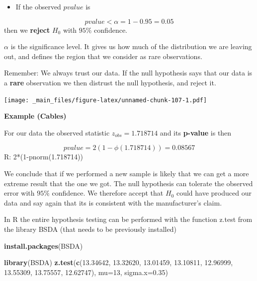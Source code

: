 \documentclass[
]{book}
\newenvironment{Shaded}{\begin{snugshade}}{\end{snugshade}}
\newcommand{\AttributeTok}[1]{\textcolor[rgb]{0.13,0.29,0.53}{#1}}
\newcommand{\DecValTok}[1]{\textcolor[rgb]{0.00,0.00,0.81}{#1}}
\newcommand{\FloatTok}[1]{\textcolor[rgb]{0.00,0.00,0.81}{#1}}
\newcommand{\FunctionTok}[1]{\textcolor[rgb]{0.13,0.29,0.53}{\textbf{#1}}}
\newcommand{\NormalTok}[1]{#1}
\providecommand{\tightlist}{%
  \setlength{\itemsep}{0pt}\setlength{\parskip}{0pt}}
\begin{document}
\begin{itemize}
\tightlist
\item
  If the observed \(pvalue\) is
\end{itemize}

\[pvalue < \alpha =1-0.95=0.05\]
then we \textbf{reject} \(H_0\) with \(95\%\) confidence.

\(\alpha\) is the significance level. It gives us how much of the distribution we are leaving out, and defines the region that we consider as rare observations.

Remember: We always trust our data. If the null hypothesis says that our data is a \textbf{rare} observation we then distrust the null hypothesis, and reject it.

\texttt{[image: \_main\_files/figure-latex/unnamed-chunk-107-1.pdf]}

\textbf{Example (Cables)}

For our data the observed statistic \(z_{obs}=1.718714\) and its \textbf{p-value} is then

\[pvalue=2 (1-\phi(1.718714))=0.08567\]
R: 2*(1-pnorm(1.718714))

We conclude that if we performed a new sample is likely that we can get a more extreme result that the one we got. The null hypothesis can tolerate the observed error with \(95\%\) confidence. We therefore accept that \(H_0\) could have produced our data and say again that its is consistent with the manufacturer's claim.

In R the entire hypothesis testing can be performed with the function z.test from the library BSDA (that needs to be previously installed)

\begin{Shaded}
\begin{Highlighting}[]
\FunctionTok{install.packages}\NormalTok{(BSDA) }
\end{Highlighting}
\end{Shaded}

\begin{Shaded}
\begin{Highlighting}[]
\FunctionTok{library}\NormalTok{(BSDA) }
\FunctionTok{z.test}\NormalTok{(}\FunctionTok{c}\NormalTok{(}\FloatTok{13.34642}\NormalTok{, }\FloatTok{13.32620}\NormalTok{, }\FloatTok{13.01459}\NormalTok{, }\FloatTok{13.10811}\NormalTok{, }
         \FloatTok{12.96999}\NormalTok{, }\FloatTok{13.55309}\NormalTok{, }\FloatTok{13.75557}\NormalTok{, }\FloatTok{12.62747}\NormalTok{), }
       \AttributeTok{mu=}\DecValTok{13}\NormalTok{, }
       \AttributeTok{sigma.x=}\FloatTok{0.35}\NormalTok{)}
\end{Highlighting}
\end{Shaded}
\end{document}
